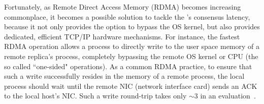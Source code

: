 



Fortunately, as Remote Direct Access Memory (RDMA) becomes increasing 
commonplace, it becomes a possible solution to tackle the \paxos's consensus 
latency, because it not only provides the option to bypass the OS kernel, but 
also provides dedicated, efficient TCP/IP hardware mechanisms. For instance, 
the fastest RDMA operation allows a process to directly write to the user space 
memory of a remote replica's process, completely bypassing the remote OS kernel 
or CPU (the so called ``one-sided" operations). As a common RDMA practice, to 
ensure that such a write successfully resides in the memory of a remote 
process, the local process should wait until the remote NIC (network interface 
card) sends an ACK to the local host's NIC. Such a write round-trip takes only 
$\sim$3 \us in an evaluation~\cite{pilaf:usenix14}.


